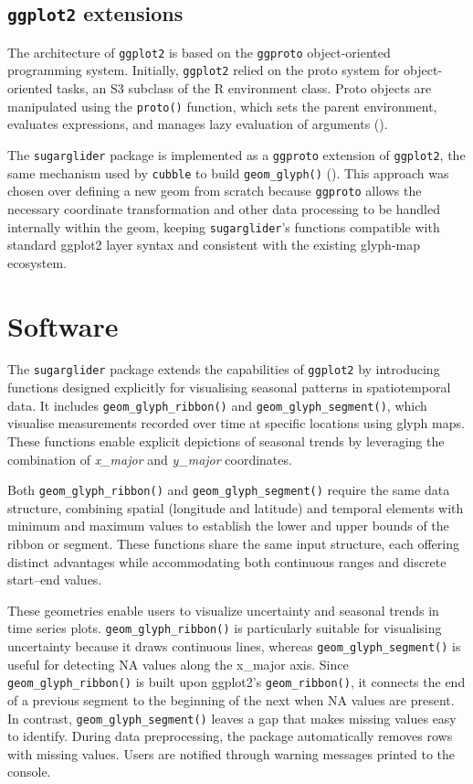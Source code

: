 \subsection{\texorpdfstring{\texttt{ggplot2} extensions}{ggplot2 extensions}}\label{ggplot2-extensions}

The architecture of \texttt{ggplot2} is based on the \texttt{ggproto} object-oriented programming system. Initially, \texttt{ggplot2} relied on the proto system for object-oriented tasks, an S3 subclass of the R environment class. Proto objects are manipulated using the \texttt{proto()} function, which sets the parent environment, evaluates expressions, and manages lazy evaluation of arguments (\citet{proto}).

The \texttt{sugarglider} package is implemented as a \texttt{ggproto} extension of \texttt{ggplot2}, the same mechanism used by \texttt{cubble} to build \texttt{geom\_glyph()} (\citet{JSSv110i07}). This approach was chosen over defining a new geom from scratch because \texttt{ggproto} allows the necessary coordinate transformation and other data processing to be handled internally within the geom, keeping \texttt{sugarglider}'s functions compatible with standard ggplot2 layer syntax and consistent with the existing glyph-map ecosystem.

\section{Software}\label{software}

The \texttt{sugarglider} package extends the capabilities of \texttt{ggplot2} by introducing functions designed explicitly for visualising seasonal patterns in spatiotemporal data. It includes \texttt{geom\_glyph\_ribbon()} and \texttt{geom\_glyph\_segment()}, which visualise measurements recorded over time at specific locations using glyph maps. These functions enable explicit depictions of seasonal trends by leveraging the combination of \emph{x\_major} and \emph{y\_major} coordinates.

Both \texttt{geom\_glyph\_ribbon()} and \texttt{geom\_glyph\_segment()} require the same data structure, combining spatial (longitude and latitude) and temporal elements with minimum and maximum values to establish the lower and upper bounds of the ribbon or segment. These functions share the same input structure, each offering distinct advantages while accommodating both continuous ranges and discrete start--end values.

These geometries enable users to visualize uncertainty and seasonal trends in time series plots. \texttt{geom\_glyph\_ribbon()} is particularly suitable for visualising uncertainty because it draws continuous lines, whereas \texttt{geom\_glyph\_segment()} is useful for detecting NA values along the x\_major axis. Since \texttt{geom\_glyph\_ribbon()} is built upon ggplot2's \texttt{geom\_ribbon()}, it connects the end of a previous segment to the beginning of the next when NA values are present. In contrast, \texttt{geom\_glyph\_segment()} leaves a gap that makes missing values easy to identify. During data preprocessing, the package automatically removes rows with missing values. Users are notified through warning messages printed to the console.

